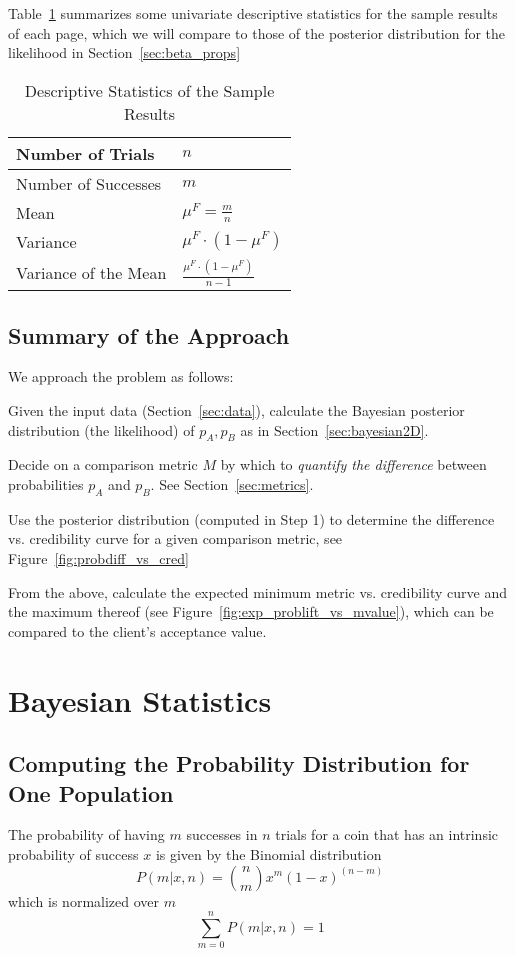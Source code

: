 \documentclass[letterpaper,12pt]{article}
\newcommand{\beq}{\begin{equation}} %
\newcommand{\eeq}{\end{equation}} %
\begin{document}
Table~\ref{table:1Dstats} summarizes some univariate descriptive
statistics for the sample results of each page, which we will compare
to those of the posterior distribution for the likelihood in
Section~\ref{sec:beta_props}
\begin{table}
\centering
\begin{tabular}{|l|l|} \hline \hline
Number of Trials & \(n\) \\ \hline
Number of Successes & \(m\) \\ \hline
Mean & \(\mu^F =\frac{m}{n}\) \\ \hline
Variance & \(\mu^F\cdot (1-\mu^F)\) \\ \hline
Variance of the Mean & \(\frac{\mu^F\cdot(1-\mu^F)}{n-1}\) \\ \hline
\hline
\end{tabular}
\caption{Descriptive Statistics of the Sample Results}
\label{table:1Dstats}
\end{table}

\subsection{Summary of the Approach}\label{sec:approach}
We approach the problem as follows:
\be
\item 
Given the input data (Section~\ref{sec:data}), calculate the Bayesian
posterior distribution (the likelihood) of \(p_A, p_B\) as in
Section~\ref{sec:bayesian2D}.
\item
Decide on a comparison metric \(M\) by which to {\em quantify the
  difference} between probabilities \(p_A\) and \(p_B\). See
Section~\ref{sec:metrics}.
\item 
Use the posterior distribution (computed in Step 1) to determine the
difference vs. credibility curve for a given comparison metric, see
Figure~\ref{fig:probdiff_vs_cred}
\item From the above, calculate the expected minimum metric
  vs. credibility curve and the maximum thereof (see
  Figure~\ref{fig:exp_problift_vs_mvalue}), which can be compared to
  the client's acceptance value.  \ee

\section{Bayesian Statistics}\label{sec:bayesian}

\subsection{Computing the Probability Distribution for One Population}
\label{sec:bayesian1D}
The probability of having \(m\) successes in \(n\) trials for a coin
that has an intrinsic probability of success \(x\) is given by the
Binomial distribution 
\beq
\label{eq:binomial}
P(m|x,n)={n \choose m}x^m (1-x)^{(n-m)}
\eeq
which is normalized over \(m\)
\beq
\label{eq:bin_normalized}
\sum_{m=0}^{n} P(m|x,n) = 1
\eeq
\end{document}
